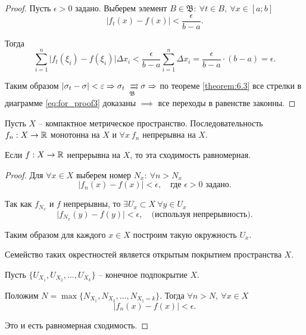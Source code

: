 \begin{proof}
    Пусть $ \epsilon > 0 $ задано. Выберем элемент $ B \in \mathfrak{B}: \ \forall t \in B, \ \forall x \in [a;b] $
    \[
        \big|f_t(x) - f(x)\big| < \frac{\epsilon}{b - a}.
    \]

    Тогда
    \[
        \sum_{i=1}^{n}\big|f_t(\xi_i) - f(\xi_i)\big|\Delta x_i < \frac{\epsilon}{b - a}\sum_{i=1}^{n}\Delta x_i = \frac{\epsilon}{b-a}\cdot(b-a) = \epsilon.
    \]

    Таким образом $ | \sigma_t - \sigma | < \epsilon \implies \sigma_t \xrightrightarrows[\mathfrak{B}]{} \sigma \implies $ по теореме \ref{theorem:6.3} все стрелки в диаграмме \ref{eq:for_proof3} доказаны $ \implies $ все переходы в равенстве законны.
\end{proof}

\begin{theorem}[Дини]
    Пусть $ X $ -- компактное метрическое пространство. Последовательность $ f_n: X \rightarrow\mathbb{R} $ монотонна на $ X $ и $ \forall x \ f_n $ непрерывна на $ X $.

    Если $ f: X \rightarrow \mathbb{R} $ непрерывна на $ X $, то эта сходимость равномерная.
\end{theorem}

\begin{proof}
    Для $ \forall x \in X $ выберем номер $ N_x: \ \forall n > N_x $
    \[
        \big|f_n(x) - f(x)\big| < \epsilon, \quad \text{где }\epsilon>0 \text{ задано}.
    \]

    Так как $ f_{N_x} $ и $ f $ непрерывны, то $ \exists U_x \subset X \ \forall y \in U_x $
    \[
        \big|f_{N_x}(y) - f(y)\big| < \epsilon, \quad \text{(используя непрерывность)}.
    \]

    Таким образом для каждого $ x \in X $ построим такую окружность $ U_x $.

    Семейство таких окрестностей является открытым покрытием пространства $ X $.

    Пусть $ \{U_{X_1},U_{X_2},\ldots,U_{X_k}\} $ -- конечное подпокрытие $ X $.

    Положим $ N = \max\{N_{X_1},N_{X_2},\ldots,N_{X_1=k}\} $. Тогда $ \forall n > N, \ \forall x \in X $
    \[
        \big|f_n(x) - f(x)\big| < \epsilon.
    \]

    Это и есть равномерная сходимость.
\end{proof}